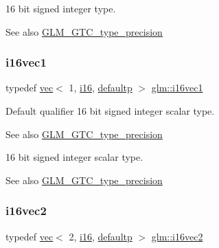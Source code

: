 16 bit signed integer type. \begin{DoxySeeAlso}{See also}
\mbox{\hyperlink{group__gtc__type__precision}{G\+L\+M\+\_\+\+G\+T\+C\+\_\+type\+\_\+precision}} 
\end{DoxySeeAlso}
\mbox{\label{group__gtc__type__precision_ga51ac9cc5aa60aa41bf37ccbf900db94f}} 
\subsubsection{\texorpdfstring{i16vec1}{i16vec1}}
{\footnotesize\ttfamily typedef \mbox{\hyperlink{structglm_1_1vec}{vec}}$<$ 1, \mbox{\hyperlink{group__gtc__type__precision_ga35e5542ca05b29cc256fdafb8503d1fd}{i16}}, \mbox{\hyperlink{namespaceglm_a36ed105b07c7746804d7fdc7cc90ff25a9d21ccd8b5a009ec7eb7677befc3bf51}{defaultp}} $>$ \mbox{\hyperlink{group__gtc__type__precision_ga51ac9cc5aa60aa41bf37ccbf900db94f}{glm\+::i16vec1}}}

Default qualifier 16 bit signed integer scalar type. \begin{DoxySeeAlso}{See also}
\mbox{\hyperlink{group__gtc__type__precision}{G\+L\+M\+\_\+\+G\+T\+C\+\_\+type\+\_\+precision}}
\end{DoxySeeAlso}
16 bit signed integer scalar type. \begin{DoxySeeAlso}{See also}
\mbox{\hyperlink{group__gtc__type__precision}{G\+L\+M\+\_\+\+G\+T\+C\+\_\+type\+\_\+precision}} 
\end{DoxySeeAlso}
\mbox{\label{group__gtc__type__precision_gad912fd04abb876a5b806118ec6e0f283}} 
\subsubsection{\texorpdfstring{i16vec2}{i16vec2}}
{\footnotesize\ttfamily typedef \mbox{\hyperlink{structglm_1_1vec}{vec}}$<$ 2, \mbox{\hyperlink{group__gtc__type__precision_ga35e5542ca05b29cc256fdafb8503d1fd}{i16}}, \mbox{\hyperlink{namespaceglm_a36ed105b07c7746804d7fdc7cc90ff25a9d21ccd8b5a009ec7eb7677befc3bf51}{defaultp}} $>$ \mbox{\hyperlink{group__gtc__type__precision_gad912fd04abb876a5b806118ec6e0f283}{glm\+::i16vec2}}}

